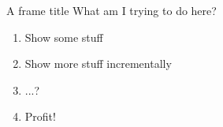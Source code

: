\documentclass{beamer}
\begin{document}
\begin{frame}{A frame title}
What am I trying to do here?
\begin{enumerate}[<+->]
   \item Show some stuff
   \item Show more stuff incrementally
   \item ...?
   \item Profit!
\end{enumerate}

\end{frame}
\end{document}
